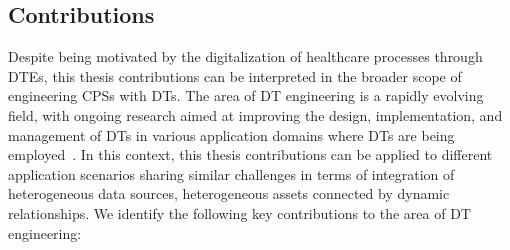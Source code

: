 \subsection*{Contributions}

Despite being motivated by the digitalization of healthcare processes through \acp{DTE}, this thesis contributions can be interpreted in the broader scope of engineering \acp{CPS} with \acp{DT}.
%
The area of \ac{DT} engineering is a rapidly evolving field, with ongoing research aimed at improving the design, implementation, and management of \acp{DT} in various application domains where \acp{DT} are being employed~\cite{Mihai_survey_enabling_2022}.
%
In this context, this thesis contributions can be applied to different application scenarios sharing similar challenges in terms of integration of heterogeneous data sources, heterogeneous assets connected by dynamic relationships.
We identify the following key contributions to the area of \ac{DT} engineering:

